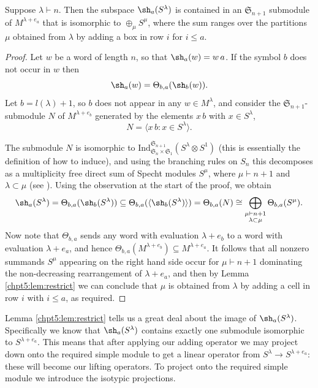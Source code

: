 \documentclass[11pt]{report}
\begin{document}
\begin{lemma}
	\label{chpt5:lem:lives}
	Suppose $\lambda\vdash n$.
	Then the subspace $\sh_{a}(S^{\lambda})$ is contained in an 
	$\mathfrak{S}_{n+1}$ submodule of $M^{\lambda+e_{a}}$ that is 
	isomorphic to 
	$\oplus_{\mu} S^{\mu}$, where the sum ranges over the partitions $\mu$ 
	obtained 
	from $\lambda$ by adding a box in row $i$ for $i\leq a$.
\end{lemma}

\begin{proof}
	Let $w$ be a word of length $n$, so that $\sh_{a}(w) = w \, a$.
	If the symbol $b$ does not occur in $w$ then
	\[\sh_{a}(w) = \Theta_{b,a}(\sh_{b}(w)).\]
	Let $b =l(\lambda) +1$, so $b$ does not appear in any $w \in 
	M^{\lambda}$, and 
	consider the $\mathfrak{S}_{n+1}$-submodule $N$ of 
	$M^{\lambda + e_{b}}$ generated by the elements $x\, b$ with $x  \in 
	S^{\lambda}$,
	\[N = \langle x \, b : x \in S^{\lambda} \rangle.\]
	
	
	
	
	
	
	
	The submodule $N$ is isomorphic to 
	$\text{Ind}^{\mathfrak{S}_{n+1}}_{\mathfrak{S}_{n} \times 
		\mathfrak{S}_{1}} 
	(S^{\lambda} \otimes S^{1})$ (this is essentially the definition of how 
	to induce), and using the branching 
	rules on $S_{n}$ this decomposes as a 
	multiplicity free 
	direct sum of Specht modules $S^{\mu}$, where $\mu \vdash n+1$ and 
	$\lambda 
	\subset \mu$ (see \cite[Theorem I.7]{geissinger1978representations}).
	Using the observation at the start of the proof, we obtain
	\[\sh_{a}(S^{\lambda}) = \Theta_{b,a}(\sh_{b}(S^{\lambda})) \subseteq 
	\Theta_{b,a}(\langle \sh_{b}(S^{\lambda}) \rangle) = \Theta_{b,a}(N) 
	\cong \bigoplus_{\substack{\mu \vdash n+1 \\ \lambda \subset \mu}} \Theta_{b,a}(S^{\mu}).\]
	Now note that $\Theta_{b,a}$ sends any word with evaluation 
	$\lambda+e_b$ to a word with evaluation $\lambda+e_a$, and hence
	$\Theta_{b,a}(M^{\lambda +e_{b}}) \subseteq M^{\lambda +e_{a}}$. 
	It follows that all nonzero summands $S^\mu$ appearing on the right 
	hand side occur for $\mu\vdash n+1$ dominating the non-decreasing rearrangement of $\lambda+e_a$, and then
	by Lemma \ref{chpt5:lem:restrict} we can conclude that $\mu$ is obtained from 
	$\lambda$ by adding a cell in row $i$ with $i \leq a$, as required.
\end{proof}

Lemma \ref{chpt5:lem:restrict} tells us a great deal about the image of $\sh_{a}(S^{\lambda})$. Specifically we know that 
$\sh_{a}(S^{\lambda})$ contains exactly one submodule isomorphic to 
$S^{\lambda+e_{a}}$. This means that after applying our adding operator we may project down onto the required simple module to get a linear operator from $S^{\lambda} \to S^{\lambda+e_{a}}$: these will become our lifting operators. To project onto the required simple module we introduce the isotypic projections. 
\end{document}
